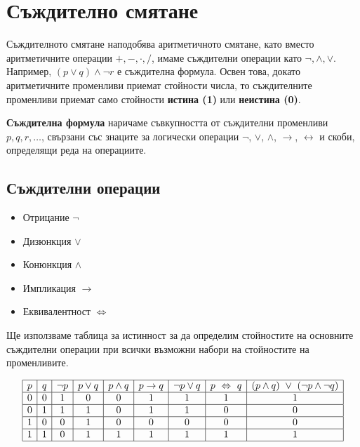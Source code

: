 \section{Съждително смятане}
\label{sect:propositional}

Съждителното смятане наподобява аритметичното смятане, като вместо аритметичните операции $+,-,\cdot,/$, 
имаме съждителни операции като $\neg, \wedge, \vee$.
Например, $(p\vee q) \wedge \neg  r$ е съждителна формула.
Освен това, докато аритметичните променливи приемат стойности числа, то
съждителните променливи приемат само стойности {\bf истина (1)} или {\bf неистина (0)}.

{\bf Съждителна формула} наричаме съвкупността от съждителни променливи $p,q,r,\dots$, свързани със знаците за логически операции
$\neg$, $\vee$, $\wedge$, $\rightarrow$, $\leftrightarrow$ и скоби, определящи реда на операциите.

\subsection*{Съждителни операции}

\begin{itemize}
\item
  Отрицание $\neg$
\item 
  Дизюнкция $\vee$
\item
  Конюнкция $\wedge$
\item
  Импликация $\rightarrow$
\item
  Еквивалентност $\iff$
\end{itemize}

Ще използваме таблица за истинност за да определим стойностите на основните съждителни операции
при всички възможни набори на стойностите на променливите.

\[
\begin{array}{|c|c|c|c|c|c|c|c|c|}
  \hline
  p & q & \neg p & p \vee q & p \wedge q & p \rightarrow q & \neg p \vee q & p \iff q & (p \wedge q)\ \vee\ (\neg p\wedge \neg q) \\
  \hline
  0 & 0 & 1 & 0 & 0 & 1 & 1 & 1 & 1\\
  \hline
  0 & 1 & 1 & 1 & 0 & 1 & 1 & 0 & 0\\
  \hline
  1 & 0 & 0 & 1 & 0 & 0 & 0 & 0 & 0\\
  \hline
  1 & 1 & 0 & 1 & 1 & 1 & 1 & 1 & 1\\
  \hline
\end{array}
\]



